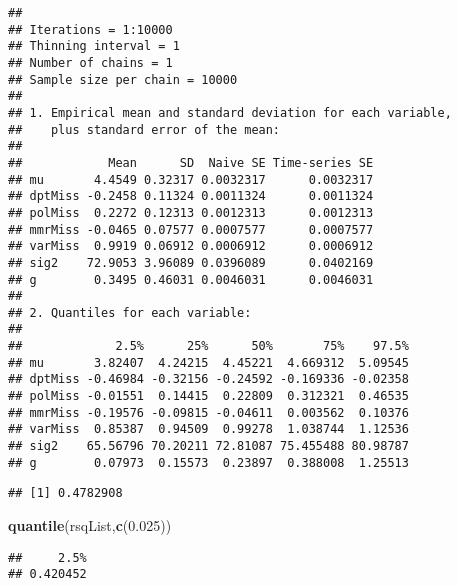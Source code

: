 \documentclass[]{article}
\newenvironment{Shaded}{\begin{snugshade}}{\end{snugshade}}
\newcommand{\DecValTok}[1]{\textcolor[rgb]{0.00,0.00,0.81}{#1}}
\newcommand{\FloatTok}[1]{\textcolor[rgb]{0.00,0.00,0.81}{#1}}
\newcommand{\KeywordTok}[1]{\textcolor[rgb]{0.13,0.29,0.53}{\textbf{#1}}}
\newcommand{\NormalTok}[1]{#1}
\newcommand{\OperatorTok}[1]{\textcolor[rgb]{0.81,0.36,0.00}{\textbf{#1}}}
\newcommand{\StringTok}[1]{\textcolor[rgb]{0.31,0.60,0.02}{#1}}
\begin{document}
\begin{verbatim}
## 
## Iterations = 1:10000
## Thinning interval = 1 
## Number of chains = 1 
## Sample size per chain = 10000 
## 
## 1. Empirical mean and standard deviation for each variable,
##    plus standard error of the mean:
## 
##            Mean      SD  Naive SE Time-series SE
## mu       4.4549 0.32317 0.0032317      0.0032317
## dptMiss -0.2458 0.11324 0.0011324      0.0011324
## polMiss  0.2272 0.12313 0.0012313      0.0012313
## mmrMiss -0.0465 0.07577 0.0007577      0.0007577
## varMiss  0.9919 0.06912 0.0006912      0.0006912
## sig2    72.9053 3.96089 0.0396089      0.0402169
## g        0.3495 0.46031 0.0046031      0.0046031
## 
## 2. Quantiles for each variable:
## 
##             2.5%      25%      50%       75%    97.5%
## mu       3.82407  4.24215  4.45221  4.669312  5.09545
## dptMiss -0.46984 -0.32156 -0.24592 -0.169336 -0.02358
## polMiss -0.01551  0.14415  0.22809  0.312321  0.46535
## mmrMiss -0.19576 -0.09815 -0.04611  0.003562  0.10376
## varMiss  0.85387  0.94509  0.99278  1.038744  1.12536
## sig2    65.56796 70.20211 72.81087 75.455488 80.98787
## g        0.07973  0.15573  0.23897  0.388008  1.25513
\end{verbatim}

\begin{Shaded}
\end{Shaded}

\begin{verbatim}
## [1] 0.4782908
\end{verbatim}

\begin{Shaded}
\begin{Highlighting}[]
\KeywordTok{quantile}\NormalTok{(rsqList,}\KeywordTok{c}\NormalTok{(}\FloatTok{0.025}\NormalTok{))}
\end{Highlighting}
\end{Shaded}

\begin{verbatim}
##     2.5% 
## 0.420452
\end{verbatim}
\end{document}
